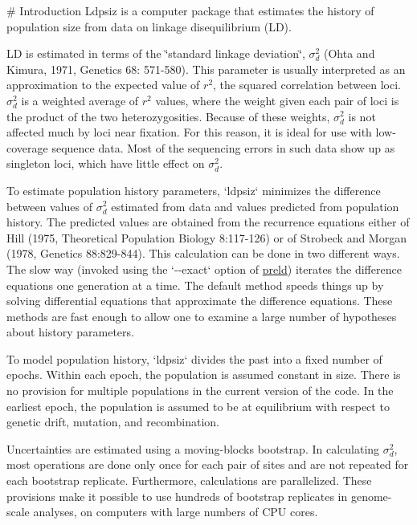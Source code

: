 \# \-Introduction \-Ldpsiz is a computer package that estimates the history of population size from data on linkage disequilibrium (\-L\-D).

\-L\-D is estimated in terms of the \char`\"{}standard linkage deviation\char`\"{}, $\sigma_d^2$ (\-Ohta and \-Kimura, 1971, \-Genetics 68\-: 571-\/580). \-This parameter is usually interpreted as an approximation to the expected value of $r^2$, the squared correlation between loci. $\sigma_d^2$ is a weighted average of $r^2$ values, where the weight given each pair of loci is the product of the two heterozygosities. \-Because of these weights, $\sigma_d^2$ is not affected much by loci near fixation. \-For this reason, it is ideal for use with low-\/coverage sequence data. \-Most of the sequencing errors in such data show up as singleton loci, which have little effect on $\sigma_d^2$.

\-To estimate population history parameters, `ldpsiz` minimizes the difference between values of $\sigma_d^2$ estimated from data and values predicted from population history. \-The predicted values are obtained from the recurrence equations either of \-Hill (1975, \-Theoretical \-Population \-Biology 8\-:117-\/126) or of \-Strobeck and \-Morgan (1978, \-Genetics 88\-:829-\/844). \-This calculation can be done in two different ways. \-The slow way (invoked using the `-\/-\/exact` option of \hyperlink{preld}{preld}) iterates the difference equations one generation at a time. \-The default method speeds things up by solving differential equations that approximate the difference equations. \-These methods are fast enough to allow one to examine a large number of hypotheses about history parameters.

\-To model population history, `ldpsiz` divides the past into a fixed number of epochs. \-Within each epoch, the population is assumed constant in size. \-There is no provision for multiple populations in the current version of the code. \-In the earliest epoch, the population is assumed to be at equilibrium with respect to genetic drift, mutation, and recombination.

\-Uncertainties are estimated using a moving-\/blocks bootstrap. \-In calculating $\sigma_d^2$, most operations are done only once for each pair of sites and are not repeated for each bootstrap replicate. \-Furthermore, calculations are parallelized. \-These provisions make it possible to use hundreds of bootstrap replicates in genome-\/scale analyses, on computers with large numbers of \-C\-P\-U cores.

